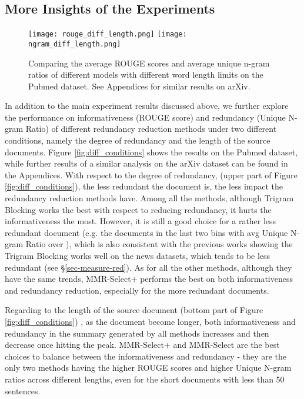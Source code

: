 \documentclass[11pt,a4paper]{article}
\begin{document}
\subsection{More Insights of the Experiments}
\begin{figure}
    \centering
    \texttt{[image: rouge\_diff\_length.png]}
    \texttt{[image: ngram\_diff\_length.png]}
    \caption{Comparing the average ROUGE scores and average unique n-gram ratios of different models with different word length limits on the Pubmed dataset. See Appendices for similar results on arXiv.}
    \label{fig:diff_length}
\end{figure}
In addition to the main experiment results discussed above, we further explore the performance on informativeness (ROUGE score) and redundancy (Unique N-gram Ratio) of different redundancy reduction methods under two different conditions, namely the degree of redundancy and the length of the source documents. Figure \ref{fig:diff_conditions} shows the results on the Pubmed dataset, while further results of a similar analysis on the arXiv dataset can be found in the Appendices. With respect to the degree of redundancy, (upper part of Figure \ref{fig:diff_conditions}), the less redundant the document is, the less impact the redundancy reduction methods have. Among all the methods, although Trigram Blocking works the best with respect to reducing redundancy, it hurts the informativeness the most. However, it is still a good choice for a rather less redundant document (e.g. the documents in the last two bins with avg Unique N-gram Ratio over ), which is also consistent with the previous works showing the Trigram Blocking works well on the news datasets, which tends to be less redundant (see \S\ref{sec-measure-red}). As for all the other methods, although they have the same trends, MMR-Select+ performs the best on both informativeness and redundancy reduction, especially for the more redundant documents. 

Regarding to the length of the source document (bottom part of Figure \ref{fig:diff_conditions}) , as the document become longer, both informativeness and redundancy in the summary generated by all methods increases and then decrease once hitting the peak. MMR-Select+ and MMR-Select are the best choices to balance between the informativeness and redundancy - they are the only two methods having the higher ROUGE scores and higher Unique N-gram ratios across different lengths, even for the short documents with less than 50 sentences.
\end{document}
